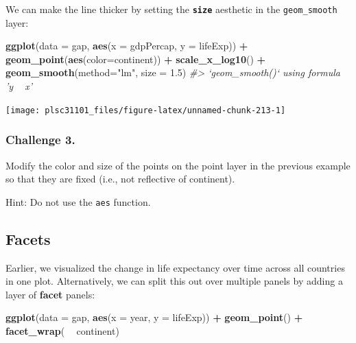 \documentclass[
]{book}
\newenvironment{Shaded}{\begin{snugshade}}{\end{snugshade}}
\newcommand{\CommentTok}[1]{\textcolor[rgb]{0.56,0.35,0.01}{\textit{#1}}}
\newcommand{\DataTypeTok}[1]{\textcolor[rgb]{0.13,0.29,0.53}{#1}}
\newcommand{\FloatTok}[1]{\textcolor[rgb]{0.00,0.00,0.81}{#1}}
\newcommand{\KeywordTok}[1]{\textcolor[rgb]{0.13,0.29,0.53}{\textbf{#1}}}
\newcommand{\NormalTok}[1]{#1}
\newcommand{\OperatorTok}[1]{\textcolor[rgb]{0.81,0.36,0.00}{\textbf{#1}}}
\newcommand{\StringTok}[1]{\textcolor[rgb]{0.31,0.60,0.02}{#1}}
\begin{document}
We can make the line thicker by setting the \textbf{\texttt{size}} aesthetic in the \texttt{geom\_smooth} layer:

\begin{Shaded}
\begin{Highlighting}[]
\KeywordTok{ggplot}\NormalTok{(}\DataTypeTok{data =}\NormalTok{ gap, }\KeywordTok{aes}\NormalTok{(}\DataTypeTok{x =}\NormalTok{ gdpPercap, }\DataTypeTok{y =}\NormalTok{ lifeExp)) }\OperatorTok{+}\StringTok{ }
\StringTok{  }\KeywordTok{geom_point}\NormalTok{(}\KeywordTok{aes}\NormalTok{(}\DataTypeTok{color=}\NormalTok{continent)) }\OperatorTok{+}\StringTok{ }
\StringTok{  }\KeywordTok{scale_x_log10}\NormalTok{() }\OperatorTok{+}\StringTok{ }
\StringTok{  }\KeywordTok{geom_smooth}\NormalTok{(}\DataTypeTok{method=}\StringTok{"lm"}\NormalTok{, }\DataTypeTok{size =} \FloatTok{1.5}\NormalTok{)}
\CommentTok{#> `geom_smooth()` using formula 'y ~ x'}
\end{Highlighting}
\end{Shaded}

\begin{center}\texttt{[image: plsc31101\_files/figure-latex/unnamed-chunk-213-1]} \end{center}

\hypertarget{challenge-3.-3}{%
\subsubsection*{Challenge 3.}\label{challenge-3.-3}}

Modify the color and size of the points on the point layer in the previous example so that they are fixed (i.e., not reflective of continent).

Hint: Do not use the \texttt{aes} function.

\hypertarget{facets}{%
\subsection{Facets}\label{facets}}

Earlier, we visualized the change in life expectancy over time across all countries in one plot. Alternatively, we can split this out over multiple panels by adding a layer of \textbf{facet} panels:

\begin{Shaded}
\begin{Highlighting}[]
\KeywordTok{ggplot}\NormalTok{(}\DataTypeTok{data =}\NormalTok{ gap, }\KeywordTok{aes}\NormalTok{(}\DataTypeTok{x =}\NormalTok{ year, }\DataTypeTok{y =}\NormalTok{ lifeExp)) }\OperatorTok{+}
\StringTok{  }\KeywordTok{geom_point}\NormalTok{() }\OperatorTok{+}\StringTok{ }
\StringTok{  }\KeywordTok{facet_wrap}\NormalTok{( }\OperatorTok{~}\StringTok{ }\NormalTok{continent)}
\end{Highlighting}
\end{Shaded}
\end{document}
